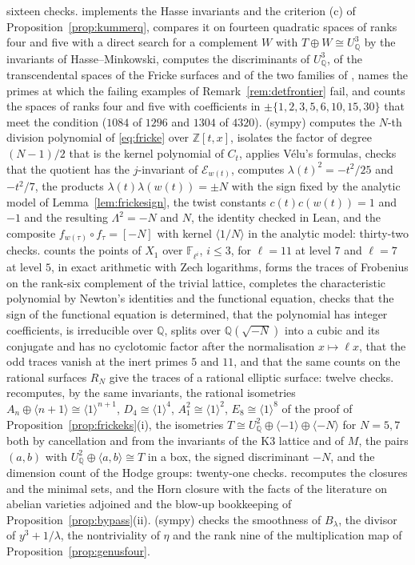\documentclass[11pt,reqno]{amsart}
\numberwithin{equation}{section}
\theoremstyle{plain}
\theoremstyle{definition}
\newcommand{\QQ}{\mathbb{Q}}
\newcommand{\ZZ}{\mathbb{Z}}
\begin{document}
sixteen checks.  implements the Hasse invariants and the criterion (c) of Proposition~\ref{prop:kummerq}, compares it on fourteen quadratic spaces of ranks four and five with a direct search for a complement $W$ with $T\oplus W\cong U_{\QQ}^{3}$ by the invariants of Hasse--Minkowski, computes the discriminants of $U_{\QQ}^{3}$, of the transcendental spaces of the Fricke surfaces and of the two families of \cite{Var25}, names the primes at which the failing examples of Remark~\ref{rem:detfrontier} fail, and counts the spaces of ranks four and five with coefficients in $\pm\{1,2,3,5,6,10,15,30\}$ that meet the condition ($1084$ of $1296$ and $1304$ of $4320$).  (sympy) computes the $N$-th division polynomial of \eqref{eq:fricke} over $\ZZ[t,x]$, isolates the factor of degree $(N-1)/2$ that is the kernel polynomial of $C_{t}$, applies V\'elu's formulas, checks that the quotient has the $j$-invariant of $\mathcal{E}_{w(t)}$, computes $\lambda(t)^{2}=-t^{2}/25$ and $-t^{2}/7$, the products $\lambda(t)\lambda(w(t))=\pm N$ with the sign fixed by the analytic model of Lemma~\ref{lem:frickesign}, the twist constants $c(t)c(w(t))=1$ and $-1$ and the resulting $\Lambda^{2}=-N$ and $N$, the identity checked in Lean, and the composite $f_{w(\tau)}\circ f_{\tau}=[-N]$ with kernel $\langle1/N\rangle$ in the analytic model: thirty-two checks.  counts the points of $X_{1}$ over $\mathbb{F}_{\ell^{i}}$, $i\le3$, for $\ell=11$ at level $7$ and $\ell=7$ at level $5$, in exact arithmetic with Zech logarithms, forms the traces of Frobenius on the rank-six complement of the trivial lattice, completes the characteristic polynomial by Newton's identities and the functional equation, checks that the sign of the functional equation is determined, that the polynomial has integer coefficients, is irreducible over $\QQ$, splits over $\QQ(\sqrt{-N})$ into a cubic and its conjugate and has no cyclotomic factor after the normalisation $x\mapsto\ell x$, that the odd traces vanish at the inert primes $5$ and $11$, and that the same counts on the rational surfaces $R_{N}$ give the traces of a rational elliptic surface: twelve checks.  recomputes, by the same invariants, the rational isometries $A_{n}\oplus\langle n+1\rangle\cong\langle1\rangle^{n+1}$, $D_{4}\cong\langle1\rangle^{4}$, $A_{1}^{2}\cong\langle1\rangle^{2}$, $E_{8}\cong\langle1\rangle^{8}$ of the proof of Proposition~\ref{prop:frickeks}(i), the isometries $T\cong U_{\QQ}^{2}\oplus\langle-1\rangle\oplus\langle-N\rangle$ for $N=5,7$ both by cancellation and from the invariants of the K3 lattice and of $M$, the pairs $(a,b)$ with $U_{\QQ}^{2}\oplus\langle a,b\rangle\cong T$ in a box, the signed discriminant $-N$, and the dimension count of the Hodge groups: twenty-one checks.  recomputes the closures and the minimal sets, and  the Horn closure with the facts of the literature on abelian varieties adjoined and the blow-up bookkeeping of Proposition~\ref{prop:bypass}(ii).  (sympy) checks the smoothness of $B_{\lambda}$, the divisor of $y^{3}+1/\lambda$, the nontriviality of $\eta$ and the rank nine of the multiplication map of Proposition~\ref{prop:genusfour}. 
\end{document}
